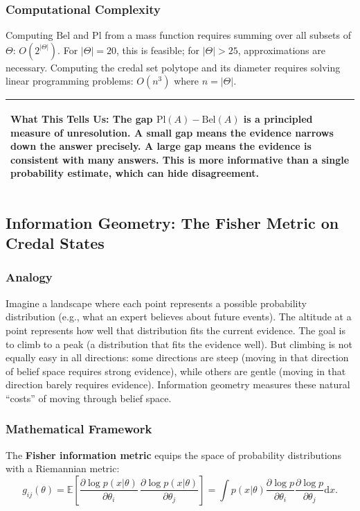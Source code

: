 \documentclass[11pt,letterpaper]{article}
\theoremstyle{definition}
\theoremstyle{remark}
\newenvironment{insightbox}{%
  \vspace{0.3cm}%
  \noindent\begin{tabular}{|p{\dimexpr\textwidth-4\tabcolsep-2\arrayrulewidth}|}
  \hline
  \small\itshape\color{accent}
}{%
  \\ \hline
  \end{tabular}
  \vspace{0.3cm}
}
\begin{document}
\subsubsection*{Computational Complexity}

Computing $\mathrm{Bel}$ and $\mathrm{Pl}$ from a mass function requires summing over all subsets of $\Theta$: $O(2^{|\Theta|})$. For $|\Theta| = 20$, this is feasible; for $|\Theta| > 25$, approximations are necessary. Computing the credal set polytope and its diameter requires solving linear programming problems: $O(n^3)$ where $n = |\Theta|$.

\begin{insightbox}
\textbf{What This Tells Us:} The gap $\mathrm{Pl}(A) - \mathrm{Bel}(A)$ is a principled measure of unresolution. A small gap means the evidence narrows down the answer precisely. A large gap means the evidence is consistent with many answers. This is more informative than a single probability estimate, which can hide disagreement.
\end{insightbox}

\subsection{Information Geometry: The Fisher Metric on Credal States}
\label{sec:fisher}

\subsubsection*{Analogy}

Imagine a landscape where each point represents a possible probability distribution (e.g., what an expert believes about future events). The altitude at a point represents how well that distribution fits the current evidence. The goal is to climb to a peak (a distribution that fits the evidence well). But climbing is not equally easy in all directions: some directions are steep (moving in that direction of belief space requires strong evidence), while others are gentle (moving in that direction barely requires evidence). Information geometry measures these natural ``costs'' of moving through belief space.

\subsubsection*{Mathematical Framework}

The \textbf{Fisher information metric} equips the space of probability distributions with a Riemannian metric:
\[
g_{ij}(\theta) = \mathbb{E}\!\left[\frac{\partial \log p(x|\theta)}{\partial \theta_i}\,\frac{\partial \log p(x|\theta)}{\partial \theta_j}\right] = \int p(x|\theta) \frac{\partial \log p}{\partial \theta_i} \frac{\partial \log p}{\partial \theta_j} \mathrm{d}x.
\]
\end{document}
